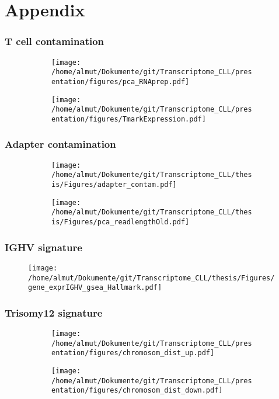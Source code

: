 \documentclass[xcolor=dvipsnames,t,10pt]{beamer}
\begin{document}
\section{Appendix}
\begin{frame}[c]
\frametitle{T cell contamination}
		\begin{figure}
			\centering
			\begin{subfigure}[t]{0.5\columnwidth}
				\texttt{[image: /home/almut/Dokumente/git/Transcriptome\_CLL/presentation/figures/pca\_RNAprep.pdf]}
			\end{subfigure}
			\hfill
			\begin{subfigure}[t]{0.5\columnwidth}
				\texttt{[image: /home/almut/Dokumente/git/Transcriptome\_CLL/presentation/figures/TmarkExpression.pdf]}
			\end{subfigure}
		\end{figure}
\end{frame}
%
%
\begin{frame}[c]
	\frametitle{Adapter contamination}
	\begin{figure}
		\centering
		\begin{subfigure}[t]{0.48\columnwidth}
			\texttt{[image: /home/almut/Dokumente/git/Transcriptome\_CLL/thesis/Figures/adapter\_contam.pdf]}
		\end{subfigure}
		\hfill
		\begin{subfigure}[t]{0.43\columnwidth}
			\texttt{[image: /home/almut/Dokumente/git/Transcriptome\_CLL/thesis/Figures/pca\_readlengthOld.pdf]}
		\end{subfigure}
	\end{figure}
\end{frame}
%
%
%
\begin{frame}[c]
	\frametitle{IGHV signature}
	\begin{figure}
		\centering
		\texttt{[image: /home/almut/Dokumente/git/Transcriptome\_CLL/thesis/Figures/gene\_exprIGHV\_gsea\_Hallmark.pdf]}
	\end{figure}
\end{frame}
%
%
%
\begin{frame}[c]
	\frametitle{Trisomy12 signature}
	\begin{figure}
		\centering
		\begin{subfigure}[t]{0.45\columnwidth}
			\texttt{[image: /home/almut/Dokumente/git/Transcriptome\_CLL/presentation/figures/chromosom\_dist\_up.pdf]}
		\end{subfigure}
		\hfill
		\begin{subfigure}[t]{0.45\columnwidth}
			\texttt{[image: /home/almut/Dokumente/git/Transcriptome\_CLL/presentation/figures/chromosom\_dist\_down.pdf]}
		\end{subfigure}
	\end{figure}
\end{frame}
%
%
\end{document}
